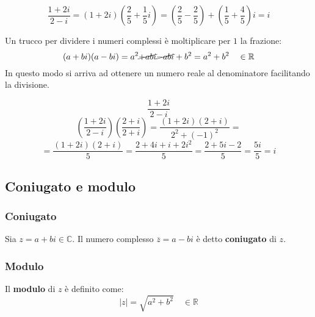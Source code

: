 \documentclass[a4paper]{article}
\theoremstyle{break}
\theoremstyle{break}
\theoremstyle{break}
\theoremstyle{break}
\begin{document}
\begin{figure}[H]
	\begin{example}
		\[
			\frac{1+2i}{2-i} = \left(1+2i\right)\left(\frac{2}{5}+\frac{1}{5}i\right) = \left( \frac{2}{5}-\frac{2}{5} \right) + \left( \frac{1}{5} + \frac{4}{5} \right) i = i
		\]
	\end{example}
\end{figure}

\noindent Un trucco per dividere i numeri complessi è moltiplicare per \( 1 \) la frazione:
\[
	(a+bi)(a-bi) = a^2 \cancel{+abi} \cancel{- abi} + b^2 = a^2 + b^2 \quad \in \mathbb{R}
\]
In questo modo si arriva ad ottenere un numero reale al denominatore facilitando la divisione.
\begin{figure}[H]
	\begin{example}
		\[
			\frac{1+2i}{2-i}
		\]
		\[
			\left( \frac{1+2i}{2-i} \right) \left( \frac{2+i}{2+i} \right) = \frac{(1+2i)(2+i)}{2^2+(-1)^2} =
		\]
		\[
			= \frac{(1+2i)(2+i)}{5} = \frac{2+4i+i+2i^2}{5} = \frac{2+5i-2}{5} = \frac{5i}{5} = i
		\]
	\end{example}
\end{figure}

\subsection{Coniugato e modulo}
\subsubsection{Coniugato}
Sia \( z = a +bi \in \mathbb{C} \). Il numero complesso \( \overline{z} = a - bi \) è detto
\textbf{coniugato} di \( z \).

\subsubsection{Modulo}
Il \textbf{modulo} di \( z \) è definito come:
\[
	|z| = \sqrt{a^2 + b^2} \quad \in \mathbb{R}
\]
\end{document}
